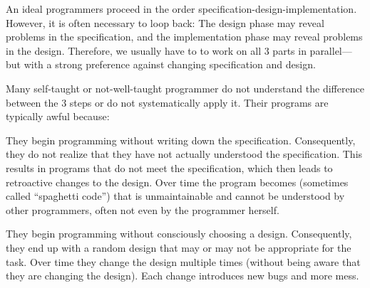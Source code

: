 An ideal programmers proceed in the order specification-design-implementation.
However, it is often necessary to loop back: The design phase may reveal problems in the specification, and the implementation phase may reveal problems in the design.
Therefore, we usually have to to work on all $3$ parts in parallel---but with a strong preference against changing specification and design.

Many self-taught or not-well-taught programmer do not understand the difference between the $3$ steps or do not systematically apply it.
Their programs are typically awful because:
\begin{compactitem}
 \item They begin programming without writing down the specification.
 Consequently, they do not realize that they have not actually understood the specification.
 This results in programs that do not meet the specification, which then leads to retroactive changes to the design.
 Over time the program becomes (sometimes called ``spaghetti code'') that is unmaintainable and cannot be understood by other programmers, often not even by the programmer herself.
 \item They begin programming without consciously choosing a design.
 Consequently, they end up with a random design that may or may not be appropriate for the task.
 Over time they change the design multiple times (without being aware that they are changing the design).
 Each change introduces new bugs and more mess.
\end{compactitem}

